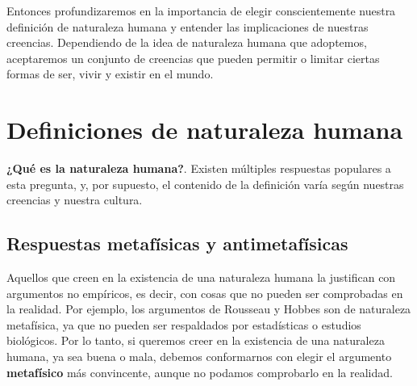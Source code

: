 \documentclass[
  letterpaper,
  DIV=11,
  numbers=noendperiod]{scrartcl}
\begin{document}
Entonces profundizaremos en la importancia de elegir conscientemente
nuestra definición de naturaleza humana y entender las implicaciones de
nuestras creencias. Dependiendo de la idea de naturaleza humana que
adoptemos, aceptaremos un conjunto de creencias que pueden permitir o
limitar ciertas formas de ser, vivir y existir en el mundo.

\hypertarget{definiciones-de-naturaleza-humana}{%
\section{Definiciones de naturaleza
humana}\label{definiciones-de-naturaleza-humana}}

\textbf{¿Qué es la naturaleza humana?}. Existen múltiples respuestas
populares a esta pregunta, y, por supuesto, el contenido de la
definición varía según nuestras creencias y nuestra cultura.

\hypertarget{respuestas-metafuxedsicas-y-antimetafuxedsicas}{%
\subsection{Respuestas metafísicas y
antimetafísicas}\label{respuestas-metafuxedsicas-y-antimetafuxedsicas}}

Aquellos que creen en la existencia de una naturaleza humana la
justifican con argumentos no empíricos, es decir, con cosas que no
pueden ser comprobadas en la realidad. Por ejemplo, los argumentos de
Rousseau y Hobbes son de naturaleza metafísica, ya que no pueden ser
respaldados por estadísticas o estudios biológicos. Por lo tanto, si
queremos creer en la existencia de una naturaleza humana, ya sea buena o
mala, debemos conformarnos con elegir el argumento \textbf{metafísico}
más convincente, aunque no podamos comprobarlo en la realidad.
\end{document}
